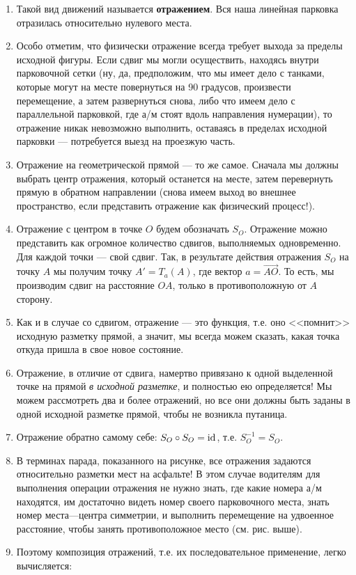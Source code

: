 \begin{enumerate}
\item Такой вид движений называется \textbf{отражением}. Вся наша линейная парковка отразилась относительно нулевого места.
\item Особо отметим, что физически отражение всегда требует выхода за пределы исходной фигуры. Если сдвиг мы могли осуществить, находясь внутри парковочной сетки (ну, да, предположим, что мы имеет дело с танками, которые могут на месте повернуться на 90 градусов, произвести перемещение, а затем развернуться снова, либо что имеем дело с параллельной парковкой, где а/м стоят вдоль направления нумерации), то отражение никак невозможно выполнить, оставаясь в пределах исходной парковки --- потребуется выезд на проезжую часть.
\item Отражение на геометрической прямой --- то же самое. Сначала мы должны выбрать центр отражения, который останется на месте, затем перевернуть прямую в обратном направлении (снова имеем выход во внешнее пространство, если представить отражение как физический процесс!).
\item Отражение с центром в точке $O$ будем обозначать $S_O$. Отражение можно представить как огромное количество сдвигов, выполняемых одновременно. Для каждой точки --- свой сдвиг. Так, в результате действия отражения $S_O$ на точку $A$ мы получим точку $A'=T_a(A)$, где вектор $a=\vec{AO}$. То есть, мы производим сдвиг на расстояние $OA$, только в противоположную от $A$ сторону.
\item Как и в случае со сдвигом, отражение --- это функция, т.е. оно <<помнит>> исходную разметку прямой, а значит, мы всегда можем сказать, какая точка откуда пришла в свое новое состояние.
\item Отражение, в отличие от сдвига, намертво привязано к одной выделенной точке на прямой \textit{в исходной разметке}, и полностью ею определяется! Мы можем рассмотреть два и более отражений, но все они должны быть заданы в одной исходной разметке прямой, чтобы не возникла путаница.
\item Отражение обратно самому себе: $S_O\circ S_O=\mathrm{id}$, т.е. $S_O^{-1}=S_O$.
\item В терминах парада, показанного на рисунке, все отражения задаются относительно разметки мест на асфальте! В этом случае водителям для выполнения операции отражения не нужно знать, где какие номера а/м находятся, им достаточно видеть номер своего парковочного места, знать номер места---центра симметрии, и выполнить перемещение на удвоенное расстояние, чтобы занять противоположное место (см. рис. выше).
\item Поэтому композиция отражений, т.е. их последовательное применение, легко вычисляется:

\end{enumerate}
